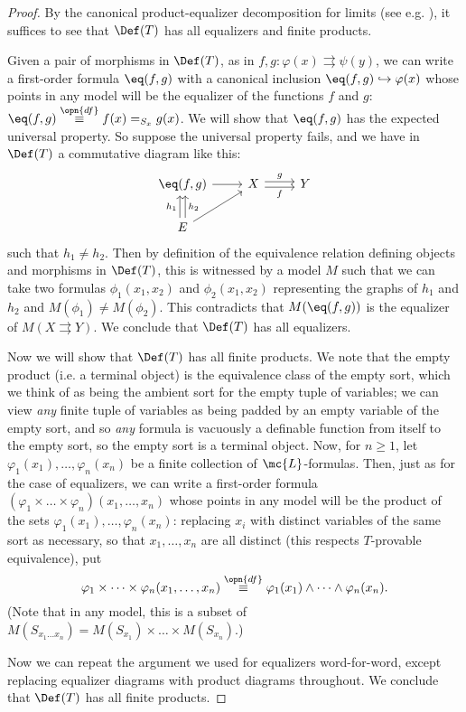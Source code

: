 \documentclass[11pt]{article}
\begin{document}
\begin{proof}
  By the canonical product-equalizer decomposition for limits (see e.g. \cite{maclane-cwm}), it suffices to see that $\Def(T)$ has all equalizers and finite products.

  Given a pair of morphisms in $\Def(T)$, as in $f,g : \varphi(x) \rightrightarrows \psi(y)$, we can write a first-order formula $\eq(f,g)$ with a canonical inclusion $\eq(f,g) \hookrightarrow \varphi(x)$ whose points in any model will be the equalizer of the functions $f$ and $g$: $\eq(f,g) \overset{\opn{df}}{\equiv} f(x) =_{S_{x}} g(x)$. We will show that $\eq(f,g)$ has the expected universal property. So suppose the universal property fails, and we have in $\Def(T)$ a commutative diagram like this:
  $$
  \begin{tikzcd}[ampersand replacement = \&]
   \eq(f,g) \arrow{r}\& X \arrow[shift right = 0.50ex,swap]{r}{f} \arrow[shift left = 0.50ex]{r}{g}\& Y \\
   E \arrow[shift left = 0.50ex]{u}{h_1} \arrow[shift right = 0.50ex, swap]{u}{h_2} \arrow{ur} \& \&
    \end{tikzcd}
    $$
    such that $h_1 \neq h_2$. Then by definition of the equivalence relation defining objects and morphisms in $\Def(T)$, this is witnessed by a model $M$ such that we can take two formulas $\phi_1(x_1, x_2)$ and $\phi_2(x_1, x_2)$ representing the graphs of $h_1$ and $h_2$ and $M(\phi_1) \neq M(\phi_2)$. This contradicts that $M(\eq(f,g))$ is the equalizer of $M(X \rightrightarrows Y)$. We conclude that $\Def(T)$ has all equalizers.

    Now we will show that $\Def(T)$ has all finite products. We note that the empty product (i.e. a terminal object) is the equivalence class of the empty sort, which we think of as being the ambient sort for the empty tuple of variables; we can view \emph{any} finite tuple of variables as being padded by an empty variable of the empty sort, and so \emph{any} formula is vacuously a definable function from itself to the empty sort, so the empty sort is a terminal object. Now, for $n \geq 1$, let $\varphi_1(x_1), \dots, \varphi_n(x_n)$ be a finite collection of $\mc{L}$-formulas. Then, just as for the case of equalizers, we can write a first-order formula $(\varphi_1 \times \dots \times \varphi_n)(x_1, \dots, x_n)$ whose points in any model will be the product of the sets $\varphi_1(x_1), \dots, \varphi_n(x_n)$: replacing $x_i$ with distinct variables of the same sort as necessary, so that $x_1, \dots, x_n$ are all distinct (this respects $T$-provable equivalence), put
    $$
\varphi_1 \times \dots \times \varphi_n(x_1, \dots, x_n) \overset{\opn{df}}{\equiv} \varphi_1(x_1) \land \dots \land \varphi_n(x_n).
$$
(Note that in any model, this is a subset of $M(S_{x_1 \dots x_n}) = M(S_{x_1}) \times \dots \times M(S_{x_n})$.)

Now we can repeat the argument we used for equalizers word-for-word, except replacing equalizer diagrams with product diagrams throughout. We conclude that $\Def(T)$ has all finite products.
\end{proof}
\end{document}
